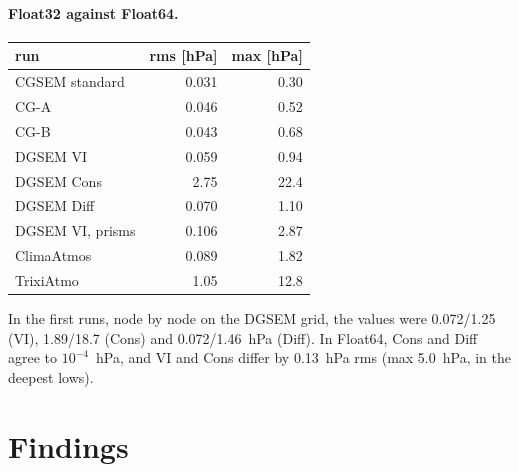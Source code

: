 \documentclass[11pt,a4paper]{article}
\begin{document}
\paragraph{Float32 against Float64.}
\begin{center}
\small
\begin{tabular}{lrr}
\toprule
run & rms [hPa] & max [hPa] \\
\midrule
CGSEM standard & 0.031 & 0.30 \\
CG-A           & 0.046 & 0.52 \\
CG-B           & 0.043 & 0.68 \\
DGSEM VI       & 0.059 & 0.94 \\
DGSEM Cons     & 2.75  & 22.4 \\
DGSEM Diff     & 0.070 & 1.10 \\
DGSEM VI, prisms & 0.106 & 2.87 \\
ClimaAtmos     & 0.089 & 1.82 \\
TrixiAtmo      & 1.05  & 12.8 \\
\bottomrule
\end{tabular}
\end{center}
In the first runs, node by node on the DGSEM grid, the values were 0.072/1.25 (VI),
1.89/18.7 (Cons) and 0.072/1.46~hPa (Diff). In Float64, Cons and
Diff agree to $10^{-4}$~hPa, and VI and Cons differ by 0.13~hPa rms
(max 5.0~hPa, in the deepest lows).

\section{Findings}
\label{sec:findings}
\end{document}
